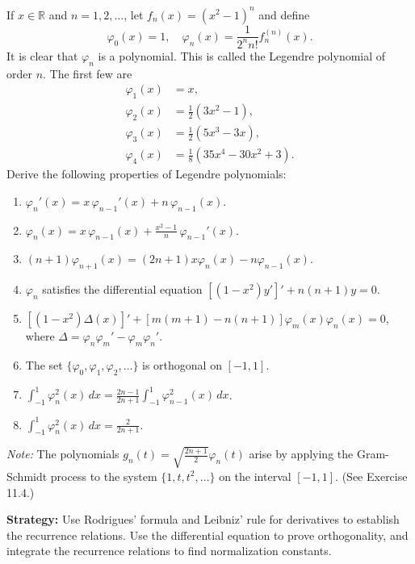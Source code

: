 \begin{problembox}
\begin{problemstatement}
If $x \in \mathbb{R}$ and $n = 1, 2, \dots$, let $f_n(x) = (x^2 - 1)^n$ and define
\[
\varphi_0(x) = 1, \quad \varphi_n(x) = \frac{1}{2^{n}n!} f_n^{(n)}(x).
\]
It is clear that $\varphi_n$ is a polynomial. This is called the Legendre polynomial of order $n$. The first few are
\[
\begin{aligned}
\varphi_1(x) &= x, \\
\varphi_2(x) &= \frac{1}{2}(3x^2 - 1), \\
\varphi_3(x) &= \frac{1}{2}(5x^3 - 3x), \\
\varphi_4(x) &= \frac{1}{8}(35x^4 - 30x^2 + 3).
\end{aligned}
\]
Derive the following properties of Legendre polynomials:
\begin{enumerate}[label=(\alph*)]
\item $\varphi_n'(x) = x \, \varphi_{n-1}'(x) + n \, \varphi_{n-1}(x)$.
\item $\varphi_n(x) = x \, \varphi_{n-1}(x) + \frac{x^2 - 1}{n} \, \varphi_{n-1}'(x)$.
\item $(n + 1) \varphi_{n+1}(x) = (2n + 1) x \varphi_n(x) - n \varphi_{n-1}(x)$.
\item $\varphi_n$ satisfies the differential equation $[(1 - x^2) y']' + n(n + 1) y = 0$.
\item $[(1 - x^2) \Delta(x)]' + [m(m + 1) - n(n + 1)] \varphi_m(x) \varphi_n(x) = 0$, where $\Delta = \varphi_n \varphi_m' - \varphi_m \varphi_n'$.
\item The set $\{\varphi_0, \varphi_1, \varphi_2, \dots\}$ is orthogonal on $[-1, 1]$.
\item $\int_{-1}^1 \varphi_n^2(x) \, dx = \frac{2n - 1}{2n + 1} \int_{-1}^1 \varphi_{n-1}^2(x) \, dx$.
\item $\int_{-1}^1 \varphi_n^2(x)\, dx = \frac{2}{2n+1}$.
\end{enumerate}
\textit{Note:} The polynomials $g_n(t) = \sqrt{\frac{2n + 1}{2}} \varphi_n(t)$ arise by applying the Gram-Schmidt process to the system $\{1, t, t^2, \dots\}$ on the interval $[-1, 1]$. (See Exercise 11.4.)
\end{problemstatement}
\end{problembox}

\noindent\textbf{Strategy:} Use Rodrigues' formula and Leibniz' rule for derivatives to establish the recurrence relations. Use the differential equation to prove orthogonality, and integrate the recurrence relations to find normalization constants.

